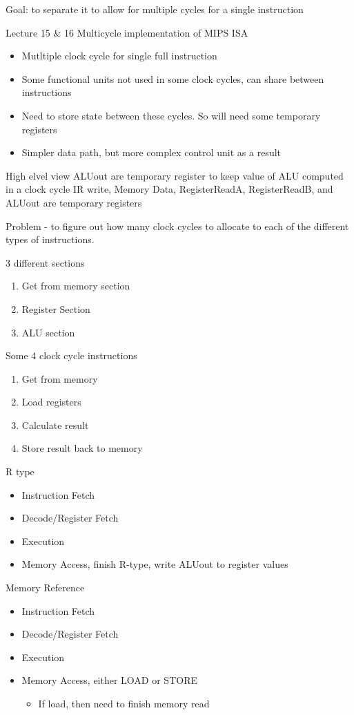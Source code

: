 \documentclass{article}
\begin{document}
			Goal: to separate it to allow for multiple cycles for a single instruction

Lecture 15 \& 16
	Multicycle implementation of MIPS ISA
		\begin{itemize}
			\item Mutltiple clock cycle for single full instruction
			\item Some functional units not used in some clock cycles, can share between instructions
			\item Need to store state between these cycles. So will need some temporary registers
			\item Simpler data path, but more complex control unit as a result
		\end{itemize}

	High elvel view
		ALUout are temporary register to keep value of ALU computed in a clock cycle
		IR write, Memory Data, RegisterReadA, RegisterReadB, and ALUout are temporary registers
		
		Problem - to figure out how many clock cycles to allocate to each of the different types of instructions.

		3 different sections 
		\begin{enumerate}
			\item Get from memory section
			\item Register Section
			\item ALU section
		\end{enumerate}

		Some 4 clock cycle instructions
		\begin{enumerate}
			\item Get from memory
			\item Load registers
			\item Calculate result
			\item Store result back to memory
		\end{enumerate}

		R type
		\begin{itemize}
			\item Instruction Fetch
			\item Decode/Register Fetch
			\item Execution
			\item Memory Access, finish R-type, write ALUout to register values
		\end{itemize}

		Memory Reference
		\begin{itemize}
			\item Instruction Fetch
			\item Decode/Register Fetch
			\item Execution
			\item Memory Access, either LOAD or STORE
			\begin{itemize}
				\item If load, then need to finish memory read
			\end{itemize}
		\end{itemize}
\end{document}
